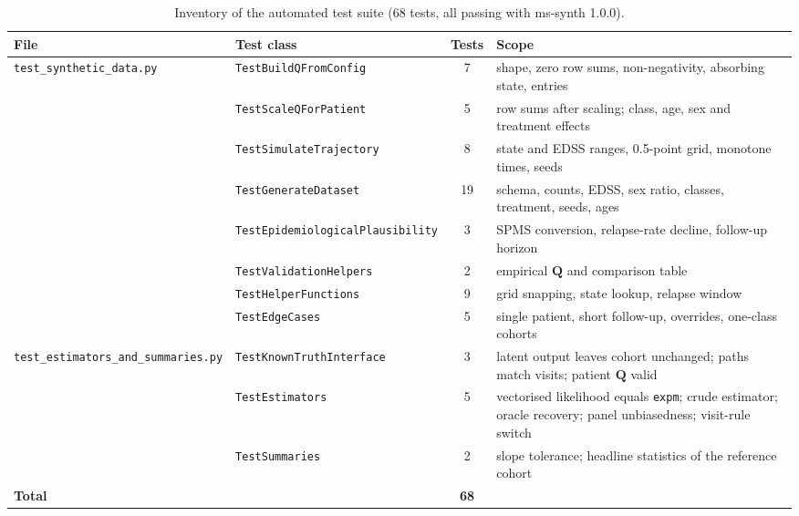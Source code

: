 \documentclass[11pt,a4paper]{article}
\begin{document}
\begin{table}[h]
\centering
\caption{Inventory of the automated test suite (68 tests, all passing with ms-synth 1.0.0).}\label{tab:S3}
\begin{tabular}{llcp{7.2cm}}
\toprule
\textbf{File} & \textbf{Test class} & \textbf{Tests} & \textbf{Scope}\\
\midrule
\texttt{test\_synthetic\_data.py} & \texttt{TestBuildQFromConfig} & 7 & shape, zero row sums, non-negativity, absorbing state, entries\\
 & \texttt{TestScaleQForPatient} & 5 & row sums after scaling; class, age, sex and treatment effects\\
 & \texttt{TestSimulateTrajectory} & 8 & state and EDSS ranges, 0.5-point grid, monotone times, seeds\\
 & \texttt{TestGenerateDataset} & 19 & schema, counts, EDSS, sex ratio, classes, treatment, seeds, ages\\
 & \texttt{TestEpidemiologicalPlausibility} & 3 & SPMS conversion, relapse-rate decline, follow-up horizon\\
 & \texttt{TestValidationHelpers} & 2 & empirical $\hat{\mathbf{Q}}$ and comparison table\\
 & \texttt{TestHelperFunctions} & 9 & grid snapping, state lookup, relapse window\\
 & \texttt{TestEdgeCases} & 5 & single patient, short follow-up, overrides, one-class cohorts\\
\texttt{test\_estimators\_and\_summaries.py} & \texttt{TestKnownTruthInterface} & 3 & latent output leaves cohort unchanged; paths match visits; patient $\mathbf{Q}$ valid\\
 & \texttt{TestEstimators} & 5 & vectorised likelihood equals \texttt{expm}; crude estimator; oracle recovery; panel unbiasedness; visit-rule switch\\
 & \texttt{TestSummaries} & 2 & slope tolerance; headline statistics of the reference cohort\\
\midrule
\multicolumn{2}{l}{\textbf{Total}} & \textbf{68} & \\
\bottomrule
\end{tabular}
\end{table}
\end{document}
